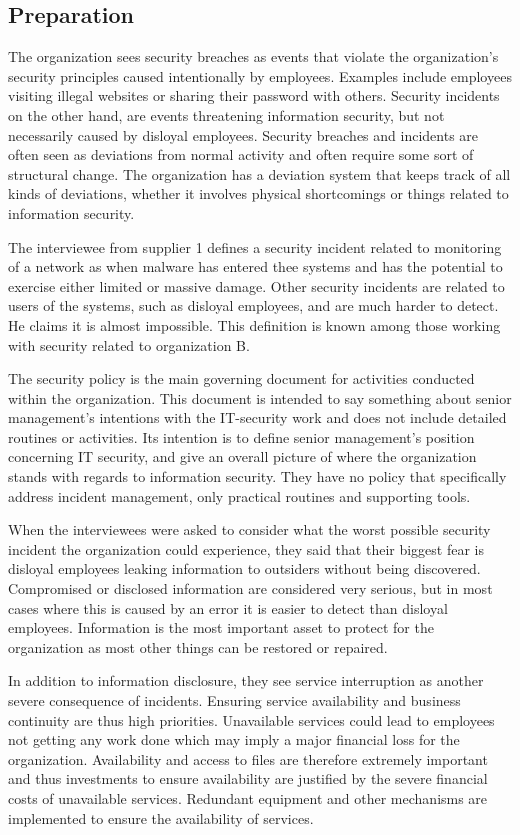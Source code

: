 \subsection{Preparation}
The organization sees security breaches as events that violate the organization's security principles caused intentionally by employees. Examples include employees visiting illegal websites or sharing their password with others. Security incidents on the other hand, are events threatening information security, but not necessarily caused by disloyal employees. Security breaches and incidents are often seen as deviations from normal activity and often require some sort of structural change. The organization has a deviation system that keeps track of all kinds of deviations, whether it involves physical shortcomings or things related to information security.

The interviewee from supplier 1 defines a security incident related to monitoring of a network as when malware has entered thee systems and has the potential to exercise either limited or massive damage. Other security incidents are related to users of the systems, such as disloyal employees, and are much harder to detect. He claims it is almost impossible. This definition is known among those working with security related to organization B. 

The security policy is the main governing document for activities conducted within the organization. This document is intended to say something about senior management's intentions with the IT-security work and does not include detailed routines or activities. Its intention is to define senior management's position concerning IT security, and give an overall picture of where the organization stands with regards to information security. They have no policy that specifically address incident management, only practical routines and supporting tools.

When the interviewees were asked to consider what the worst possible security incident the organization could experience, they said that their biggest fear is disloyal employees leaking information to outsiders without being discovered. Compromised or disclosed information are considered very serious, but in most cases where this is caused by an error it is easier to detect than disloyal employees. Information is the most important asset to protect for the organization as most other things can be restored or repaired.

In addition to information disclosure, they see service interruption as another severe consequence of incidents. Ensuring service availability and business continuity are thus high priorities. Unavailable services could lead to employees not getting any work done which may imply a major financial loss for the organization. Availability and access to files are therefore extremely important and thus investments to ensure availability are justified by the severe financial costs of unavailable services. Redundant equipment and other mechanisms are implemented to ensure the availability of services. 

